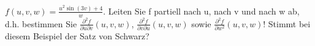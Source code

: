 \item
$f(u,v,w) = \frac{u^2 \sin(3v) +4}{w}$.
Leiten Sie f partiell nach u, nach v und nach w ab, d.h. bestimmen Sie $\frac{\partial^2 f}{\partial u \partial v}(u,v,w)$, $\frac{\partial^2 f}{\partial v \partial u}(u,v,w)$ sowie $\frac{\partial^2 f}{\partial w^2}(u,v,w)$! Stimmt bei diesem Beispiel der Satz von Schwarz?

